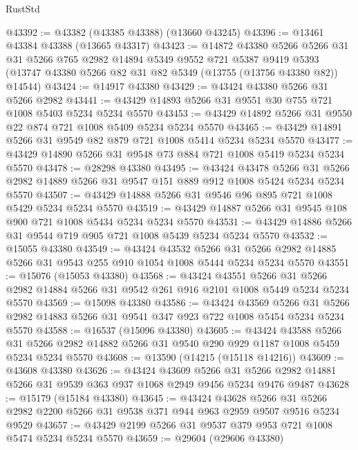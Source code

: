 \begin{lexlean}{RustStd}
\begin{coremodule}
@43392 := @43382 (@43385 @43388) (@13660 @43245)
@43396 := @13461 @43384 @43388 (@13665 @43317)
@43423 := @14872
    @43380
    @5266
    @5266
    @31
    @31
    @5266
    @765
    @2982
    @14894
    @5349
    @9552
    @721
    @5387
    @9419
    @5393
    (@13747 @43380 @5266 @82 @31 @82 @5349 (@13755 (@13756 @43380 @82)) @14544)
@43424 := @14917 @43380
@43429 := @43424 @43380 @5266 @31 @5266 @2982
@43441 := @43429 @14893 @5266 @31 @9551 @30 @755 @721 @1008 @5403 @5234 @5234 @5570
@43453 := @43429 @14892 @5266 @31 @9550 @22 @874 @721 @1008 @5409 @5234 @5234 @5570
@43465 := @43429 @14891 @5266 @31 @9549 @82 @879 @721 @1008 @5414 @5234 @5234 @5570
@43477 := @43429 @14890 @5266 @31 @9548 @73 @884 @721 @1008 @5419 @5234 @5234 @5570
@43478 := @28298 @43380
@43495 := @43424
    @43478
    @5266
    @31
    @5266
    @2982
    @14889
    @5266
    @31
    @9547
    @151
    @889
    @912
    @1008
    @5424
    @5234
    @5234
    @5570
@43507 := @43429 @14888 @5266 @31 @9546 @96 @895 @721 @1008 @5429 @5234 @5234 @5570
@43519 := @43429 @14887 @5266 @31 @9545 @108 @900 @721 @1008 @5434 @5234 @5234 @5570
@43531 := @43429 @14886 @5266 @31 @9544 @719 @905 @721 @1008 @5439 @5234 @5234 @5570
@43532 := @15055 @43380
@43549 := @43424
    @43532
    @5266
    @31
    @5266
    @2982
    @14885
    @5266
    @31
    @9543
    @255
    @910
    @1054
    @1008
    @5444
    @5234
    @5234
    @5570
@43551 := @15076 (@15053 @43380)
@43568 := @43424
    @43551
    @5266
    @31
    @5266
    @2982
    @14884
    @5266
    @31
    @9542
    @261
    @916
    @2101
    @1008
    @5449
    @5234
    @5234
    @5570
@43569 := @15098 @43380
@43586 := @43424
    @43569
    @5266
    @31
    @5266
    @2982
    @14883
    @5266
    @31
    @9541
    @347
    @923
    @722
    @1008
    @5454
    @5234
    @5234
    @5570
@43588 := @16537 (@15096 @43380)
@43605 := @43424
    @43588
    @5266
    @31
    @5266
    @2982
    @14882
    @5266
    @31
    @9540
    @290
    @929
    @1187
    @1008
    @5459
    @5234
    @5234
    @5570
@43608 := @13590 (@14215 (@15118 @14216))
@43609 := @43608 @43380
@43626 := @43424
    @43609
    @5266
    @31
    @5266
    @2982
    @14881
    @5266
    @31
    @9539
    @363
    @937
    @1068
    @2949
    @9456
    @5234
    @9476
    @9487
@43628 := @15179 (@15184 @43380)
@43645 := @43424
    @43628
    @5266
    @31
    @5266
    @2982
    @2200
    @5266
    @31
    @9538
    @371
    @944
    @963
    @2959
    @9507
    @9516
    @5234
    @9529
@43657 := @43429 @2199 @5266 @31 @9537 @379 @953 @721 @1008 @5474 @5234 @5234 @5570
@43659 := @29604 (@29606 @43380)

\end{coremodule}
\end{lexlean}
